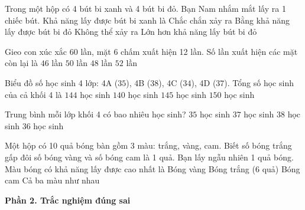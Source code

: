 \begin{ex} %
Trong một hộp có 4 bút bi xanh và 4 bút bi đỏ. Bạn Nam nhắm mắt lấy ra 1 chiếc bút. Khả năng lấy được bút bi xanh là
\choice
{Chắc chắn xảy ra}
{\True Bằng khả năng lấy được bút bi đỏ}
{Không thể xảy ra}
{Lớn hơn khả năng lấy bút bi đỏ}
\end{ex}

\begin{ex} %
Gieo con xúc xắc 60 lần, mặt 6 chấm xuất hiện 12 lần. Số lần xuất hiện các mặt còn lại là
\choice
{$46$ lần}
{$50$ lần}
{\True $48$ lần}
{$52$ lần}
\end{ex}

\begin{ex} %
Biểu đồ số học sinh 4 lớp: 4A ($35$), 4B ($38$), 4C ($34$), 4D ($37$). Tổng số học sinh của cả khối 4 là
\choice
{\True $144$ học sinh}
{$140$ học sinh}
{$145$ học sinh}
{$150$ học sinh}
\end{ex}

\begin{ex} %
Trung bình mỗi lớp khối 4 có bao nhiêu học sinh?
\choice
{$35$ học sinh}
{$37$ học sinh}
{$38$ học sinh}
{\True $36$ học sinh}
\end{ex}

\begin{ex} %
Một hộp có 10 quả bóng bàn gồm 3 màu: trắng, vàng, cam. Biết số bóng trắng gấp đôi số bóng vàng và số bóng cam là 1 quả. Bạn lấy ngẫu nhiên 1 quả bóng. Màu bóng có khả năng lấy được cao nhất là
\choice
{Bóng vàng}
{\True Bóng trắng (6 quả)}
{Bóng cam}
{Cả ba màu như nhau}
\end{ex}

\textbf{Phần 2. Trắc nghiệm đúng sai}

